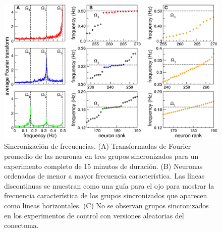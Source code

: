  \begin{figure}[h!]
	\centering\includegraphics[width=\imsize]{sincronia2.jpg}
	\caption[ Sincronización de frecuencias.]{Sincronización de frecuencias. (A) Transformadas de Fourier promedio de las neuronas en tres grupos sincronizados para un experimento completo de 15 minutos de duración. (B) Neuronas ordenadas de menor a mayor frecuencia característica. Las líneas discontinuas se muestran como una guía para el ojo para mostrar la frecuencia característica de los grupos sincronizados que aparecen como líneas horizontales. (C) No se observan grupos sincronizados en los experimentos de control con versiones aleatorias del  conectoma.}\label{fig:sincronia_2}
\end{figure}

